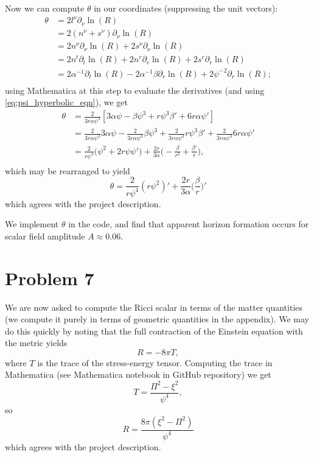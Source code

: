 \documentclass[12pt]{article}
\numberwithin{equation}{section}
\begin{document}
Now we can compute $\theta$ in our coordinates (suppressing the unit vectors):
\begin{equation}
\begin{aligned}
\theta &= 2 l^\nu \partial_\nu \ln(R) \\
&= 2 (n^\nu + s^\nu) \partial_\nu \ln(R) \\
&= 2 n^\nu \partial_\nu \ln(R) + 2 s^\nu \partial_\nu \ln(R) \\
&= 2 n^t \partial_t \ln(R) + 2 n^r \partial_r \ln(R) + 2 s^r \partial_r \ln(R) \\
&= 2 \alpha^{-1} \partial_t \ln(R) - 2 \alpha^{-1} \beta \partial_r \ln(R) + 2 \psi^{-2} \partial_r \ln(R); \\
\end{aligned}
\end{equation}
using Mathematica at this step to evaluate the derivatives (and using \ref{eq:psi_hyperbolic_eqn}), we get
\begin{equation}
\begin{aligned}
\theta &= \frac{2}{3 r \alpha \psi^3} [3 \alpha \psi - \beta \psi^3 + r \psi^3 \beta' + 6 r \alpha \psi'] \\
&= \frac{2}{3 r \alpha \psi^3} 3 \alpha \psi - \frac{2}{3 r \alpha \psi^3} \beta \psi^3 + \frac{2}{3 r \alpha \psi^3} r \psi^3 \beta' + \frac{2}{3 r \alpha \psi^3} 6 r \alpha \psi' \\
&= \frac{2}{r \psi^4} \Big( \psi^2 + 2 r \psi \psi' \Big) + \frac{2 r}{3 \alpha} \Big( - \frac{\beta}{r^2} + \frac{\beta'}{r} \Big), \\
\end{aligned}
\end{equation}
which may be rearranged to yield
\begin{equation}
\boxed{\theta = \frac{2}{r \psi^4} (r \psi^2)' + \frac{2 r}{3 \alpha} \Big( \frac{\beta}{r} \Big)' }
\end{equation}
which agrees with the project description.

We implement $\theta$ in the code, and find that apparent horizon formation occurs for scalar field amplitude $A \approx 0.06.$

\section{Problem 7}
We are now asked to compute the Ricci scalar in terms of the matter quantities (we compute it purely in terms of geometric quantities in the appendix).  We may do this quickly by noting that the full contraction of the Einstein equation with the metric yields
\begin{equation}
R = - 8 \pi T,
\end{equation}
where $T$ is the trace of the stress-energy tensor.  Computing the trace in Mathematica (see Mathematica notebook in GitHub repository) we get
\begin{equation}
T = \frac{\Pi^2 - \xi^2}{\psi^4},
\end{equation}
so
\begin{equation}
\boxed{ R = \frac{8 \pi (\xi^2 - \Pi^2)}{\psi^4} }
\end{equation}
which agrees with the project description.
\end{document}
